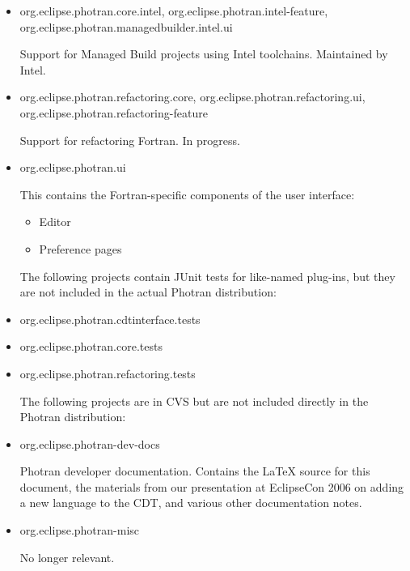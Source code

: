 \begin{itemize}
\item org.eclipse.photran.core.intel,
      org.eclipse.photran.intel-feature,
      org.eclipse.photran.managedbuilder.intel.ui

	Support for Managed Build projects using Intel toolchains.
	Maintained by Intel.

\item org.eclipse.photran.refactoring.core,
      org.eclipse.photran.refactoring.ui,
      org.eclipse.photran.refactoring-feature

	Support for refactoring Fortran.  In progress.

\item org.eclipse.photran.ui

	This contains the Fortran-specific components of the user interface:
	\begin{itemize}
	\item Editor
	\item Preference pages
	\end{itemize}

\noindent The following projects contain JUnit tests for like-named
plug-ins, but they are not included in the actual Photran distribution:

\item org.eclipse.photran.cdtinterface.tests
\item org.eclipse.photran.core.tests
\item org.eclipse.photran.refactoring.tests

\noindent The following projects are in CVS but are not included directly in the
Photran distribution:

\item org.eclipse.photran-dev-docs

	Photran developer documentation.
	Contains the LaTeX source for this document, the materials from our
	presentation at EclipseCon 2006 on adding a new language to the CDT,
	and various other documentation notes.

\item org.eclipse.photran-misc

	No longer relevant.

\end{itemize}
